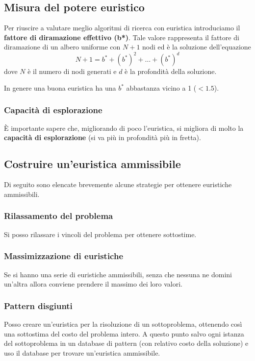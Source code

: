 \subsection{Misura del potere euristico}
Per riuscire a valutare meglio algoritmi di ricerca con euristica introduciamo il
\textbf{fattore di diramazione effettivo (b*)}. Tale valore rappresenta il fattore di diramazione
di un albero uniforme con $N + 1$ nodi ed \`e la soluzione dell'equazione
\[ N + 1 = b^* + (b^*)^2 + \dots + (b^*)^d \] dove $N$ \`e il numero di nodi generati e $d$ \`e
la profondit\`a della soluzione.

In genere una buona euristica ha una $b^*$ abbastanza vicino a 1 ($< 1.5$).

\subsubsection{Capacit\`a di esplorazione}
\`E importante sapere che, migliorando di poco l'euristica, si migliora di molto la
\textbf{capacit\`a di esplorazione} (si va pi\`u in profondit\`a pi\`u in fretta).

\subsection{Costruire un'euristica ammissibile}
Di seguito sono elencate brevemente alcune strategie per ottenere euristiche ammissibili.

\subsubsection{Rilassamento del problema}
Si posso rilassare i vincoli del problema per ottenere sottostime.

\subsubsection{Massimizzazione di euristiche}
Se si hanno una serie di euristiche ammissibili, senza che nessuna ne domini un'altra
allora conviene prendere il massimo dei loro valori.

\subsubsection{Pattern disgiunti}
Posso creare un'euristica per la risoluzione di un sottoproblema, ottenendo cos\`i una
sottostima del costo del problema intero. A questo punto salvo ogni istanza del
sottoproblema in un database di pattern (con relativo costo della soluzione) e uso il
database per trovare un'euristica ammissibile.

